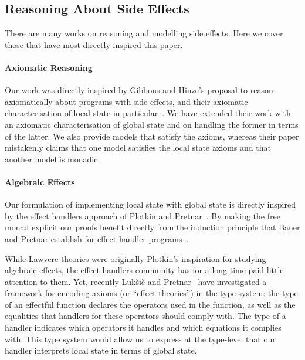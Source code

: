 \documentclass{llncs}
\begin{document}
\subsection{Reasoning About Side Effects}

There are many works on reasoning and modelling side effects. Here we cover
those that have most directly inspired this paper.

\paragraph{Axiomatic Reasoning}

Our work was directly inspired by Gibbons and Hinze's proposal to reason
axiomatically about programs with side effects, and their axiomatic
characterisation of local state in particular~\cite{GibbonsHinze:11:Just}. We
have extended their work with an axiomatic characterisation of global state and
on handling the former in terms of the latter. We also provide models that
satisfy the axioms, whereas their paper mistakenly claims that one model
satisfies the local state axioms and that another model is monadic.


\paragraph{Algebraic Effects}

Our formulation of implementing local state with global state is directly
inspired by the effect handlers approach of Plotkin and
Pretnar~\cite{Plotkin:09:Handlers}. By making the free monad explicit our
proofs benefit directly from the induction principle that Bauer and Pretnar
establish for effect handler programs~\cite{DBLP:journals/corr/BauerP13}.

While Lawvere theories were originally Plotkin's inspiration for studying
algebraic effects, the effect handlers community has for a long time paid
little attention to them. Yet, recently Luk\v{s}i\v{c} and
Pretnar~\cite{Pretnar:19} have investigated a framework for encoding axioms (or
``effect theories'') in the type system: the type of an effectful function
declares the operators used in the function, as well as the equalities that
handlers for these operators should comply with.  The type of a handler
indicates which operators it handles and which equations it complies with.
This type system would allow us to express at the type-level that our
handler interprets local state in terms of global state.
\end{document}
